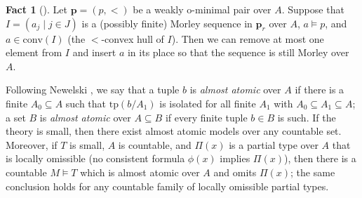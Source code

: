 \documentclass{amsart}
\theoremstyle{definition}
\theoremstyle{definition}
\newtheorem{Fact}[Theorem]{Fact}
\newcommand{\tp}{\mathrm{tp}}
\newcommand{\conv}{\mathrm{conv}}
\begin{document}
\begin{Fact}[{\cite[Proposition 7.8(a)]{MTwom}}]\label{Fact_Morley_replace}
Let $\mathbf p=(p,<)$ be a weakly o-minimal pair over $A$. Suppose that $I=(a_j\mid j\in J)$ is a (possibly finite)  Morley sequence in $\mathbf p_r$ over $A$, $a\models p$, and $a\in\conv(I)$ (the $<$-convex hull of $I$).  Then we can remove at most one element from $I$ and insert $a$ in its place so that the sequence is still Morley over $A$.     
\end{Fact}


Following Newelski \cite{Newelski}, we say that a tuple $b$ is {\em almost atomic} over $A$ if there is a finite $A_0\subseteq A$ such that $\tp(b/A_1)$ is isolated for all finite $A_1$ with $A_0\subseteq A_1\subseteq A$;
a set $B$ is {\em almost atomic} over $A\subseteq B$ if every finite tuple $b\in B$ is such. 
If the theory is small, then there exist almost atomic models over any countable set. Moreover, if $T$ is small, $A$ is countable, and $\Pi(x)$ is a partial type over $A$ that is locally omissible (no consistent formula $\phi(x)$ implies $\Pi(x)$), then there is a countable $M\models T$ which is almost atomic over $A$ and omits $\Pi(x)$; the same conclusion holds for any countable family of locally omissible partial types. 
\end{document}

